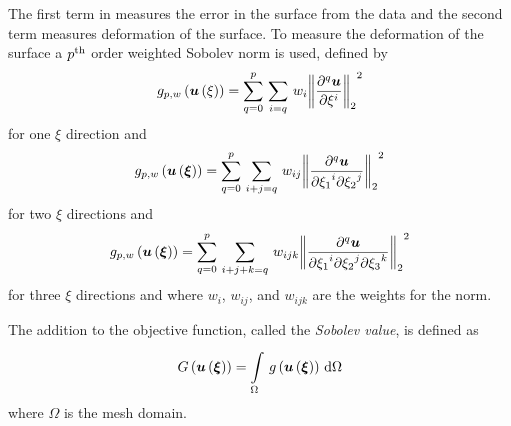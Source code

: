 The first term in  measures the error in the
surface from the data and the second term measures deformation of the surface.
To measure the deformation of the surface a ${p}^{\text{th}}$ order weighted
Sobolev norm \citep{terzopoulos:1986,zzz-tikhonov:1977} is used, defined by
\begin{equation}
  \fnof{g_{p,w}}{\fnof{\vectr{u}}{\xi}}=\gsum{q=0}{p}{\gsum{i=q}{}
  {w_{i}\norm{\delnby{q}{\vectr{u}}{\xi}{i}}^{2}}}
  \label{eqn:1DSobolevnorm}
\end{equation}
for one $\xi$ direction and
\begin{equation}
  \fnof{g_{p,w}}{\fnof{\vectr{u}}{\vectr{\xi}}}=\gsum{q=0}{p}{\gsum{i+j=q}{}
  {w_{ij}\norm{\delntwoby{q}{\vectr{u}}{\xione}{i}{\xitwo}{j}}^{2}}}
  \label{eqn:2DSobolevnorm}
\end{equation}
for two $\xi$ directions and
\begin{equation}
  \fnof{g_{p,w}}{\fnof{\vectr{u}}{\vectr{\xi}}}=\gsum{q=0}{p}{\gsum{i+j+k=q}{}
  {w_{ijk}\norm{\delnthreeby{q}{\vectr{u}}{\xione}{i}{\xitwo}{j}{\xithree}{k}}^{2}}}
  \label{eqn:3DSobolevnorm}
\end{equation}
for three $\xi$ directions and where $w_{i}$, $w_{ij}$, and $w_{ijk}$ are the weights for the norm.

The addition to the objective function, called the \emph{Sobolev value}, is
defined as
\begin{equation}
  \fnof{G}{\fnof{\vectr{u}}{\vectr{\xi}}}=\gint{\Omega}{}{\fnof{g}{
      \fnof{\vectr{u}}{\vectr{\xi}}}}{\Omega}
  \label{eqn:Sobolevvalue}
\end{equation}
where $\Omega$ is the mesh domain.

